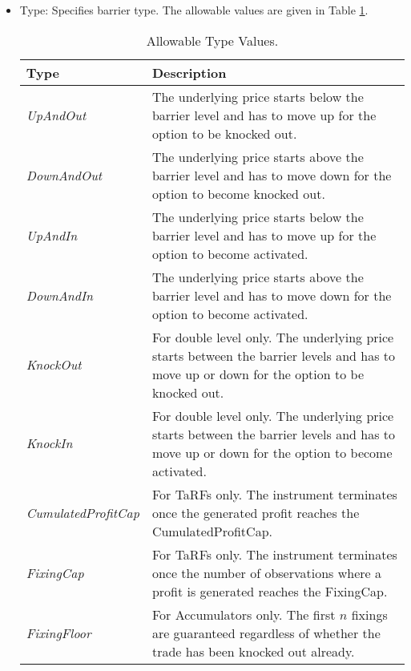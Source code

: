\begin{itemize}
\item Type: Specifies barrier type.
The allowable values are given in Table \ref{tab:barriertype}. 

\begin{table}[H]
\centering
  \begin{tabular} {|l|p{12cm}|}
    \hline
 \bfseries{Type} & \bfseries{Description} \\
    \hline
 \emph{UpAndOut} & The underlying price starts below the barrier level and has to move up for the option to be knocked out.\\ \hline
 \emph{DownAndOut} & The underlying price starts above the barrier level and has to move down for the option to become knocked out. \\ \hline
 \emph{UpAndIn} & The underlying price starts below the barrier level and has to move up for the option to become activated. \\ \hline
 \emph{DownAndIn} & The underlying price starts above the barrier level and has to move down for the option to become activated.\\ \hline
 \emph{KnockOut} & For double level only. The underlying price starts between the barrier levels and has to move up
 or down for the option to be knocked out. \\ \hline
 \emph{KnockIn} & For double level only. The underlying price starts between the barrier levels and has to move up
 or down for the option to become activated. \\ \hline
 \emph{CumulatedProfitCap} & For TaRFs only. The instrument terminates once the generated profit reaches the CumulatedProfitCap. \\ \hline
 \emph{FixingCap} & For TaRFs only. The instrument terminates once the number of observations where a profit is generated reaches the FixingCap.\\ \hline
 \emph{FixingFloor} & For Accumulators only. The first $n$ fixings are guaranteed regardless of whether the trade has been knocked out already.\\ \hline
  \end{tabular}
  \caption{Allowable Type Values.}
  \label{tab:barriertype}
\end{table}


\end{itemize}
